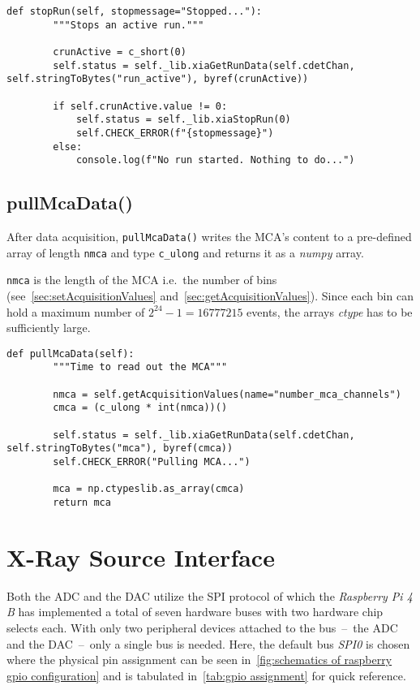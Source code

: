             \begin{lstlisting}[style=mypython, firstnumber=256, caption={XMagix method stopRun()}, label={lst:xmagix stopRun}]
    def stopRun(self, stopmessage="Stopped..."):
        """Stops an active run."""

        crunActive = c_short(0)
        self.status = self._lib.xiaGetRunData(self.cdetChan, self.stringToBytes("run_active"), byref(crunActive))

        if self.crunActive.value != 0:
            self.status = self._lib.xiaStopRun(0)
            self.CHECK_ERROR(f"{stopmessage}")
        else:
            console.log(f"No run started. Nothing to do...")
            \end{lstlisting}

        \subsection{pullMcaData()}\label{sec:pullMcaData}
            After data acquisition, \texttt{pullMcaData()} writes the MCA's content to a pre-defined array of length \texttt{nmca} and type \texttt{c\_ulong} and returns it as a \textit{numpy} array.

            \texttt{nmca} is the length of the MCA i.e.~the number of bins (see~\cref{sec:setAcquisitionValues} and~\cref{sec:getAcquisitionValues}).
            Since each bin can hold a maximum number of \(2^{24} - 1 = 16777215\) events, the arrays \textit{ctype} has to be sufficiently large.\par\medskip

            \begin{lstlisting}[style=mypython, firstnumber=271, caption={[XMagix method pullMcaData()]XMagix method pullMcaData().}, label={lst:xmagix pullMcaData}]
    def pullMcaData(self):
        """Time to read out the MCA"""
        
        nmca = self.getAcquisitionValues(name="number_mca_channels")
        cmca = (c_ulong * int(nmca))()

        self.status = self._lib.xiaGetRunData(self.cdetChan, self.stringToBytes("mca"), byref(cmca))
        self.CHECK_ERROR("Pulling MCA...")

        mca = np.ctypeslib.as_array(cmca)
        return mca
            \end{lstlisting}

    \section{X-Ray Source Interface}
        Both the ADC and the DAC utilize the SPI protocol of which the \textit{Raspberry Pi 4 B} has implemented a total of seven hardware buses with two hardware chip selects each.
        With only two peripheral devices attached to the bus~--~the ADC and the DAC~--~only a single bus is needed.
        Here, the default bus \textit{SPI0} is chosen where the physical pin assignment can be seen in~\cref{fig:schematics of raspberry gpio configuration} and is tabulated in~\cref{tab:gpio assignment} for quick reference.

